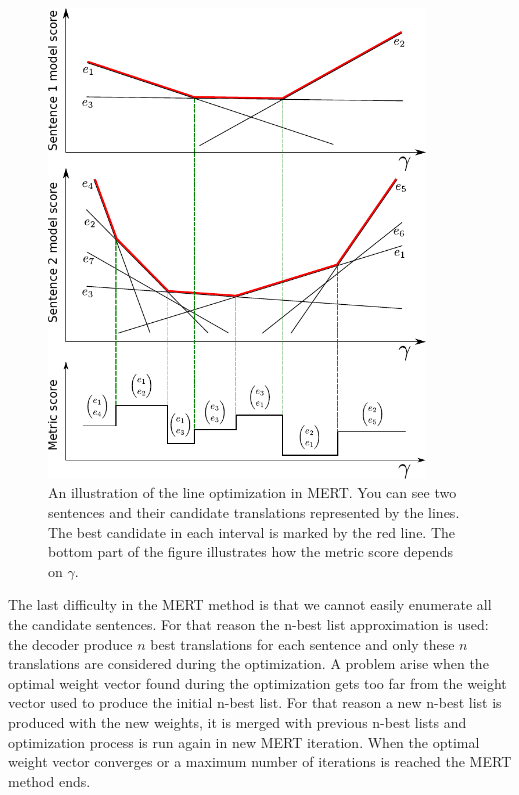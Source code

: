 \begin{figure}
    \begin{center}
        \includegraphics[width=10cm]{img/mert.pdf}
    \end{center}

    \caption[An illustration of the line optimization in MERT]{
      An illustration of the line optimization in MERT. You can see two sentences and their
      candidate translations represented by the lines. The best candidate in each interval
      is marked by the red line. The bottom part of the figure illustrates how the metric score
      depends on $\gamma$.
}

    \label{fig:lines}
\end{figure}

The last difficulty in the MERT method is that we cannot easily enumerate all
the candidate sentences. For that reason the n-best list approximation is used:
the decoder produce $n$ best translations for each sentence and only these $n$
translations are considered during the optimization. A problem arise when the
optimal weight vector found during the optimization gets too far from the
weight vector used to produce the initial n-best list. For that reason a new
n-best list is produced with the new weights, it is merged with previous n-best
lists and optimization process is run again in new MERT iteration. When the
optimal weight vector converges or a maximum number of iterations is reached
the MERT method ends. 

